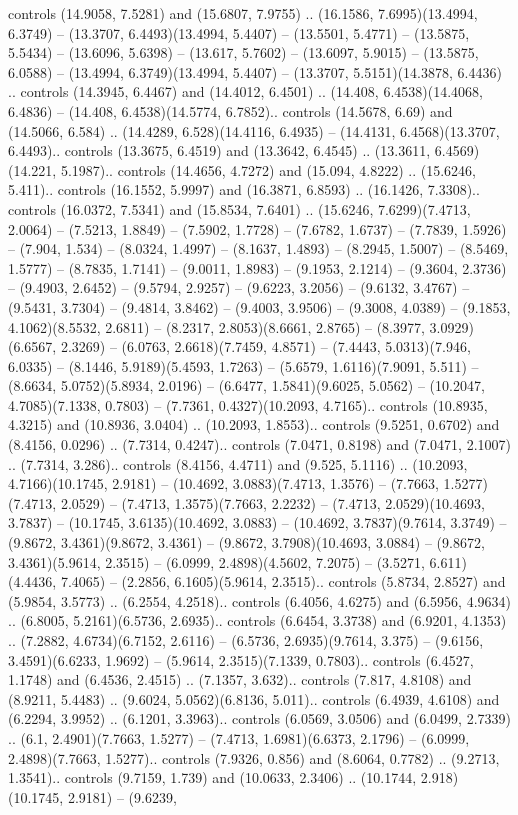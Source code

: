 controls (14.9058, 7.5281) and (15.6807, 7.9755) .. (16.1586, 7.6995)(13.4994, 6.3749) -- (13.3707, 6.4493)(13.4994, 5.4407) -- (13.5501, 5.4771) -- (13.5875, 5.5434) -- (13.6096, 5.6398) -- (13.617, 5.7602) -- (13.6097, 5.9015) -- (13.5875, 6.0588) -- (13.4994, 6.3749)(13.4994, 5.4407) -- (13.3707, 5.5151)(14.3878, 6.4436) .. controls (14.3945, 6.4467) and (14.4012, 6.4501) .. (14.408, 6.4538)(14.4068, 6.4836) -- (14.408, 6.4538)(14.5774, 6.7852).. controls (14.5678, 6.69) and (14.5066, 6.584) .. (14.4289, 6.528)(14.4116, 6.4935) -- (14.4131, 6.4568)(13.3707, 6.4493).. controls (13.3675, 6.4519) and (13.3642, 6.4545) .. (13.3611, 6.4569)(14.221, 5.1987).. controls (14.4656, 4.7272) and (15.094, 4.8222) .. (15.6246, 5.411).. controls (16.1552, 5.9997) and (16.3871, 6.8593) .. (16.1426, 7.3308).. controls (16.0372, 7.5341) and (15.8534, 7.6401) .. (15.6246, 7.6299)(7.4713, 2.0064) -- (7.5213, 1.8849) -- (7.5902, 1.7728) -- (7.6782, 1.6737) -- (7.7839, 1.5926) -- (7.904, 1.534) -- (8.0324, 1.4997) -- (8.1637, 1.4893) -- (8.2945, 1.5007) -- (8.5469, 1.5777) -- (8.7835, 1.7141) -- (9.0011, 1.8983) -- (9.1953, 2.1214) -- (9.3604, 2.3736) -- (9.4903, 2.6452) -- (9.5794, 2.9257) -- (9.6223, 3.2056) -- (9.6132, 3.4767) -- (9.5431, 3.7304) -- (9.4814, 3.8462) -- (9.4003, 3.9506) -- (9.3008, 4.0389) -- (9.1853, 4.1062)(8.5532, 2.6811) -- (8.2317, 2.8053)(8.6661, 2.8765) -- (8.3977, 3.0929)(6.6567, 2.3269) -- (6.0763, 2.6618)(7.7459, 4.8571) -- (7.4443, 5.0313)(7.946, 6.0335) -- (8.1446, 5.9189)(5.4593, 1.7263) -- (5.6579, 1.6116)(7.9091, 5.511) -- (8.6634, 5.0752)(5.8934, 2.0196) -- (6.6477, 1.5841)(9.6025, 5.0562) -- (10.2047, 4.7085)(7.1338, 0.7803) -- (7.7361, 0.4327)(10.2093, 4.7165).. controls (10.8935, 4.3215) and (10.8936, 3.0404) .. (10.2093, 1.8553).. controls (9.5251, 0.6702) and (8.4156, 0.0296) .. (7.7314, 0.4247).. controls (7.0471, 0.8198) and (7.0471, 2.1007) .. (7.7314, 3.286).. controls (8.4156, 4.4711) and (9.525, 5.1116) .. (10.2093, 4.7166)(10.1745, 2.9181) -- (10.4692, 3.0883)(7.4713, 1.3576) -- (7.7663, 1.5277)(7.4713, 2.0529) -- (7.4713, 1.3575)(7.7663, 2.2232) -- (7.4713, 2.0529)(10.4693, 3.7837) -- (10.1745, 3.6135)(10.4692, 3.0883) -- (10.4692, 3.7837)(9.7614, 3.3749) -- (9.8672, 3.4361)(9.8672, 3.4361) -- (9.8672, 3.7908)(10.4693, 3.0884) -- (9.8672, 3.4361)(5.9614, 2.3515) -- (6.0999, 2.4898)(4.5602, 7.2075) -- (3.5271, 6.611)(4.4436, 7.4065) -- (2.2856, 6.1605)(5.9614, 2.3515).. controls (5.8734, 2.8527) and (5.9854, 3.5773) .. (6.2554, 4.2518).. controls (6.4056, 4.6275) and (6.5956, 4.9634) .. (6.8005, 5.2161)(6.5736, 2.6935).. controls (6.6454, 3.3738) and (6.9201, 4.1353) .. (7.2882, 4.6734)(6.7152, 2.6116) -- (6.5736, 2.6935)(9.7614, 3.375) -- (9.6156, 3.4591)(6.6233, 1.9692) -- (5.9614, 2.3515)(7.1339, 0.7803).. controls (6.4527, 1.1748) and (6.4536, 2.4515) .. (7.1357, 3.632).. controls (7.817, 4.8108) and (8.9211, 5.4483) .. (9.6024, 5.0562)(6.8136, 5.011).. controls (6.4939, 4.6108) and (6.2294, 3.9952) .. (6.1201, 3.3963).. controls (6.0569, 3.0506) and (6.0499, 2.7339) .. (6.1, 2.4901)(7.7663, 1.5277) -- (7.4713, 1.6981)(6.6373, 2.1796) -- (6.0999, 2.4898)(7.7663, 1.5277).. controls (7.9326, 0.856) and (8.6064, 0.7782) .. (9.2713, 1.3541).. controls (9.7159, 1.739) and (10.0633, 2.3406) .. (10.1744, 2.918)(10.1745, 2.9181) -- (9.6239, 